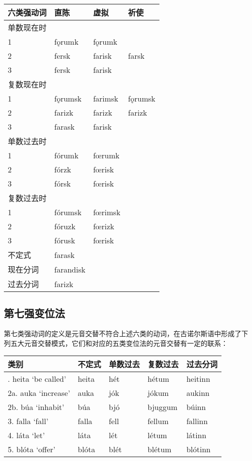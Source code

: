 \begin{longtable}{llll}
  \toprule
  六类强动词 & 直陈        & 虚拟      & 祈使      \\
  \midrule
  \endhead
  \bottomrule
  \endfoot
  单数现在时 &           &         &         \\
  1     & fǫrumk    & fǫrumk  &         \\
  2     & fersk     & farisk  & farsk   \\
  3     & fersk     & farisk  &         \\
  复数现在时 &           &         &         \\
  1     & fǫrumsk   & farimsk & fǫrumsk \\
  2     & farizk    & farizk  & farizk  \\
  3     & farask    & farisk  &         \\
  单数过去时 &           &         &         \\
  1     & fórumk    & fœrumk  &         \\
  2     & fórzk     & fœrisk  &         \\
  3     & fórsk     & fœrisk  &         \\
  复数过去时 &           &         &         \\
  1     & fórumsk   & fœrimsk &         \\
  2     & fóruzk    & fœrizk  &         \\
  3     & fórusk    & fœrisk  &         \\
  不定式   & farask    &         &         \\
  现在分词  & farandisk &         &         \\
  过去分词  & farizk    &         &         \\
\end{longtable}

\subsection{第七强变位法}\label{第七强变位法}

第七类强动词的定义是元音交替不符合上述六类的动词，在古诺尔斯语中形成了下列五大元音交替模式，它们和对应的五类变位法的元音交替有一定的联系：

\begin{longtable}{lllll}
  \toprule
  类别                   & 不定式   & 单数过去 & 复数过去    & 过去分词    \\
  \midrule
  \endhead
  \bottomrule
  \endfoot
  1. heita `be called‌' & heita & hét  & hétum   & heitinn \\
  2a. auka `increase‌'  & auka  & jók  & jókum   & aukinn  \\
  2b. búa `inhabit‌'    & búa   & bjó  & bjuggum & búinn   \\
  3. falla `fall‌'      & falla & fell & fellum  & fallinn \\
  4. láta `let‌'        & láta  & lét  & létum   & látinn  \\
  5. blóta `offer‌'     & blóta & blét & blétum  & blótinn \\
\end{longtable}

